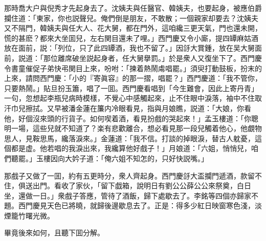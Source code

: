 那時喬大户與倪秀才先起身去了。沈姨夫與任醫官、韓姨夫，也要起身，被應伯爵攔住道：「東家，你也説聲兒。俺們倒是朋友，不敢散；一個親家却要去？沈姨夫又不隔門，韓姨夫與任大人、花大舅，都在門外，這咱纔三更天氣，門也還未開，慌的甚麽？都來大坐囬兒，左右関目還未了哩。」西門慶又令小廝，提四罈麻姑酒放在面前，説：「列位，只了此四罈酒，我也不留了。」因㧱大賞鍾，放在吴大舅面前，説道：「那位離席破坐説起身者，任大舅擧罰。」於是衆人又復坐下了。西門慶令書童催促子弟快弔関目上來，吩咐：「揀着熱鬧䖏唱罷。」須臾打動鼓板，扮末的上來，請問西門慶：「小的『寄眞容』的那一摺，唱罷？」西門慶道：「我不管你，只要熱鬧。」貼旦扮玉簫，唱了一囬。西門慶看唱到「今生難會，因此上寄丹青」一句，忽想起李瓶兒病時模樣，不覺心中感觸起來，止不住眼中淚落，袖中不住取汗巾兒擦拭。又早被潘金蓮在簾内冷眼看見，指與月娘瞧，説道：「大娘，你看他，好個沒來頭的行貨子。如何喫着酒，看見扮戲的哭起來！」孟玉樓道：「你聰明一場，這些兒就不知道了？楽有悲歡離合，想必看見那一段兒觸着他心，他覷物思人，見鞍思馬，纔落淚來。」金蓮道：「我不信。打談的掉眼淚，替古人躭憂，這個都是虚。他若唱的我淚出來，我纔算他好戲子！」月娘道：「六姐，悄悄兒，咱們聽罷。」玉樓因向大妗子道：「俺六姐不知怎的，只好快説嘴。」

那戲子又做了一囬，約有五更時分，衆人齊起身。西門慶㧱大盃攔門遞酒，款留不住，俱送出門。看收了家伙，「留下戯箱，說明日有劉公公薛公公來祭奠，白日坐，還做一日。」衆戲子答應，管待了酒飯，歸下處歇去了。李銘等四個亦歸家不題。西門慶見天色已將曉，就歸後邊歇息去了。正是：得多少紅日映窗寒色淺，淡煙籠竹曙光微。

畢竟後來如何，且聽下囬分解。

